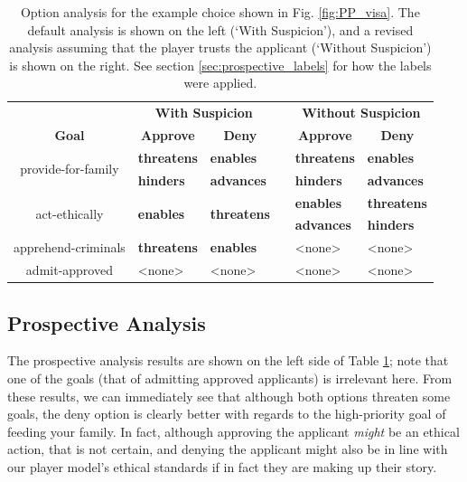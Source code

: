 \documentclass[arts,article,submit,moreauthors,pdftex,10pt,a4paper]{Definitions/mdpi}
\newcommand{\enables}{\textbf{\color{enables}enables}}
\newcommand{\advances}{\textbf{\color{advances}advances}}
\newcommand{\threatens}{\textbf{\color{threatens}threatens}}
\newcommand{\hinders}{\textbf{\color{hinders}hinders}}
\begin{document}
\begin{table}[H]
\centering
\begin{tabular}{c l l l l l}
  \toprule
  & \multicolumn{2}{c}{\textbf{With Suspicion}} && \multicolumn{2}{c}{\textbf{Without Suspicion}} \\
  \cmidrule(r){1-1} \cmidrule{2-3} \cmidrule{5-6}
  \textbf{Goal} & \multicolumn{1}{c}{\textbf{Approve}} & \multicolumn{1}{c}{\textbf{Deny}} && \multicolumn{1}{c}{\textbf{Approve}} & \multicolumn{1}{c}{\textbf{Deny}} \\
  \cmidrule(r){1-1} \cmidrule{2-3} \cmidrule{5-6}
  \multirow{2}{9em}{\centering provide-for-family} & \threatens{} & \enables{} && \threatens{} & \enables{} \\
                                        & \hinders{} & \advances{} && \hinders{} & \advances{} \\
  \cmidrule(r){1-1} \cmidrule{2-3} \cmidrule{5-6}
  \multirow{2}{9em}{\centering act-ethically} & \multirow{2}{6em}{\enables{}} & \multirow{2}{6em}{\threatens{}} && \enables{} & \threatens{} \\
  & & && \advances{} & \hinders{} \\
  \cmidrule(r){1-1} \cmidrule{2-3} \cmidrule{5-6}
  apprehend-criminals & \threatens{} & \enables{} && <none> & <none> \\
  \cmidrule(r){1-1} \cmidrule{2-3} \cmidrule{5-6}
  admit-approved & <none> & <none> && <none> & <none> \\
  \bottomrule
\end{tabular}
  \caption[\emph{Papers, Please} option analysis]{Option analysis for the example choice shown in Fig. \ref{fig:PP_visa}. The default analysis is shown on the left (`With Suspicion'), and a revised analysis assuming that the player trusts the applicant (`Without Suspicion') is shown on the right. See section \ref{sec:prospective_labels} for how the labels were applied.}
\label{tab:PP_options}
\end{table}

\subsection{Prospective Analysis}

The prospective analysis results are shown on the left side of Table \ref{tab:PP_options}; note that one of the goals (that of admitting approved applicants) is irrelevant here.
%
From these results, we can immediately see that although both options threaten some goals, the deny option is clearly better with regards to the high-priority goal of feeding your family.
%
In fact, although approving the applicant \emph{might} be an ethical action, that is not certain, and denying the applicant might also be in line with our player model's ethical standards if in fact they are making up their story.
\end{document}
